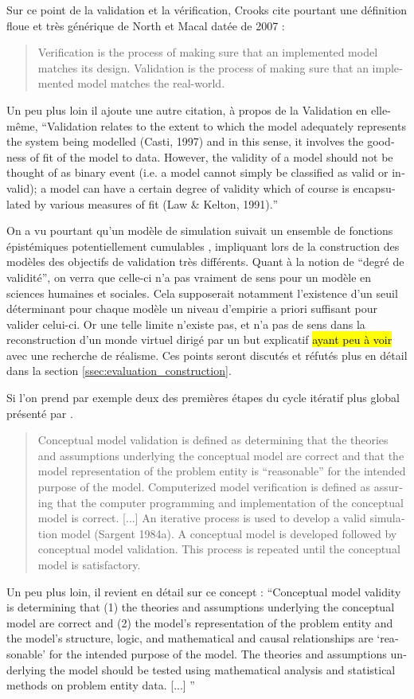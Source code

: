 Sur ce point de la validation et la vérification, Crooks cite pourtant une définition floue et très générique de North et Macal datée de 2007 :

\foreignblockquote{english}[\cite{Crooks2012}]{ Verification is the process of making sure that an implemented model matches its design. Validation is the process of making sure that an implemented model matches the real-world.} Un peu plus loin il ajoute une autre citation, à propos de la Validation en elle-même, \foreignquote{english}{Validation relates to the extent to which the model adequately represents the system being modelled (Casti, 1997) and in this sense, it involves the goodness of fit of the model to data. However, the validity of a model should not be thought of as binary event (i.e. a model cannot simply be classified as valid or invalid); a model can have a certain degree of validity which of course is encapsulated by various measures of fit (Law \& Kelton, 1991).}

On a vu pourtant qu'un modèle de simulation suivait un ensemble de fonctions épistémiques potentiellement cumulables \autocite{Varenne2013b}, impliquant lors de la construction des modèles des objectifs de validation très différents. Quant à la notion de \enquote{degré de validité}, on verra que celle-ci n'a pas vraiment de sens pour un modèle en sciences humaines et sociales. Cela supposerait notamment l'existence d'un seuil déterminant pour chaque modèle un niveau d'empirie a priori suffisant pour valider celui-ci. Or une telle limite n'existe pas, et n'a pas de sens dans la reconstruction d'un monde virtuel dirigé par un but explicatif \hl{ayant peu à voir} avec une recherche de réalisme. Ces points seront discutés et réfutés plus en détail dans la section \ref{ssec:evaluation_construction}.

Si l'on prend par exemple deux des premières étapes du cycle itératif plus global présenté par \textcite{Sargent2010}.

\foreignblockquote{english}[\cite{Sargent2010}]{Conceptual model validation is defined as determining that the theories and assumptions underlying the conceptual model are correct and that the model representation of the problem entity is \enquote{reasonable}  for the intended purpose of the model. Computerized model verification is defined as assuring that the computer programming and implementation of the conceptual model is correct. [...] An iterative process is used to develop a valid simulation model (Sargent 1984a). A conceptual model is developed followed by conceptual model validation. This process is repeated until the conceptual model is satisfactory.} Un peu plus loin, il revient en détail sur ce concept : \foreignquote{english}{Conceptual model validity is determining that (1) the theories and assumptions underlying the conceptual model are correct and (2) the model’s representation of the problem entity and the model’s structure, logic, and mathematical and causal relationships are \enquote{reasonable} for the intended purpose of the model. The theories and assumptions underlying the model should be tested using mathematical analysis and statistical methods on problem entity data. [...] }

